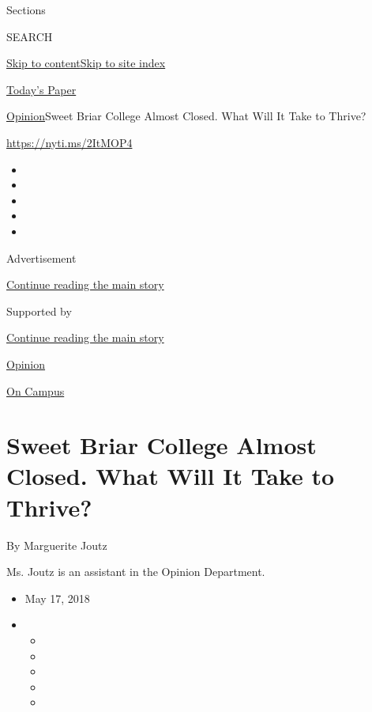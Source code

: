 Sections

SEARCH

\protect\hyperlink{site-content}{Skip to
content}\protect\hyperlink{site-index}{Skip to site index}

\href{https://myaccount.nytimes3xbfgragh.onion/auth/login?response_type=cookie\&client_id=vi}{}

\href{https://www.nytimes3xbfgragh.onion/section/todayspaper}{Today's
Paper}

\href{/section/opinion}{Opinion}\textbar{}Sweet Briar College Almost
Closed. What Will It Take to Thrive?

\url{https://nyti.ms/2ItMOP4}

\begin{itemize}
\item
\item
\item
\item
\item
\end{itemize}

Advertisement

\protect\hyperlink{after-top}{Continue reading the main story}

Supported by

\protect\hyperlink{after-sponsor}{Continue reading the main story}

\href{/section/opinion}{Opinion}

\href{/column/on-campus}{On Campus}

\hypertarget{sweet-briar-college-almost-closed-what-will-it-take-to-thrive}{%
\section{Sweet Briar College Almost Closed. What Will It Take to
Thrive?}\label{sweet-briar-college-almost-closed-what-will-it-take-to-thrive}}

By Marguerite Joutz

Ms. Joutz is an assistant in the Opinion Department.

\begin{itemize}
\item
  May 17, 2018
\item
  \begin{itemize}
  \item
  \item
  \item
  \item
  \item
  \end{itemize}
\end{itemize}

